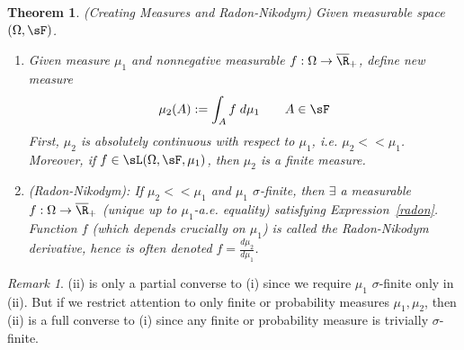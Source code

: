 \documentclass[12pt]{article}
\theoremstyle{plain}
\newtheorem{thm}{Theorem}[section]
\theoremstyle{definition}
\theoremstyle{remark}
\newtheorem*{rmk}{Remark}
\newcommand{\ra}{\rightarrow}
\begin{document}
\begin{thm}
\label{thm:radon}
\emph{(Creating Measures and Radon-Nikodym)}
Given measurable space $(\Omega,\sF)$.
\begin{enumerate}[label=\emph{(\roman*)}]
  \item
    Given measure $\mu_1$ and nonnegative measurable
    $f:\Omega\ra \overline{\R}_+$, define new measure
    \begin{align}
      \mu_2(A) := \int_A f \; d\mu_1
      \qquad A\in\sF
      \label{radon}
    \end{align}
    First, $\mu_2$ is absolutely continuous with respect to
    $\mu_1$, i.e. $\mu_2 << \mu_1$.
    Moreover, if $f\in\sL(\Omega,\sF,\mu_1)$, then $\mu_2$ is a finite
    measure.

  \item \emph{(Radon-Nikodym)}:
    If $\mu_2<<\mu_1$ and $\mu_1$ $\sigma$-finite, then $\exists$ a
    measurable $f:\Omega\ra \overline{\R}_+$
    (unique up to $\mu_1$-a.e. equality)
    satisfying Expression~\ref{radon}.
    Function $f$ (which depends crucially on $\mu_1$) is called the
    \emph{Radon-Nikodym derivative}, hence is often denoted
    $f=\frac{d\mu_2}{d\mu_1}$.
\end{enumerate}
\end{thm}
\begin{rmk}
(ii) is only a partial converse to (i) since we require $\mu_1$
$\sigma$-finite only in (ii).
But if we restrict attention to only finite or probability measures
$\mu_1,\mu_2$, then (ii) is a full converse to (i) since any finite or
probability measure is trivially $\sigma$-finite.
\end{rmk}
\end{document}
